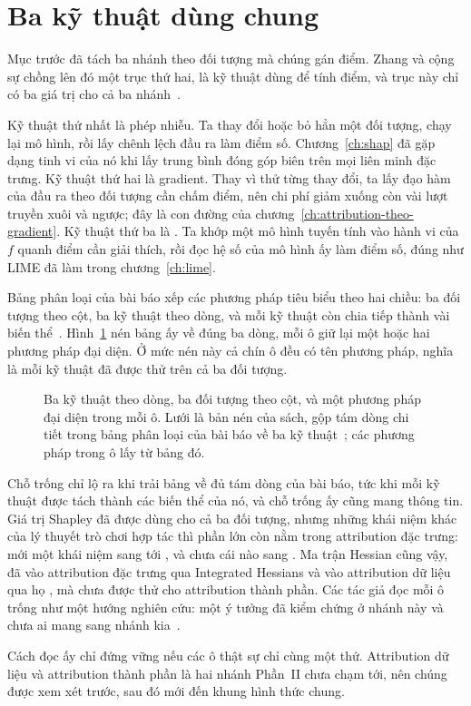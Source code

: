 \section{Ba kỹ thuật dùng chung}
\label{sec:ch07-ba-ky-thuat}

%
%
Mục trước đã tách ba nhánh theo đối tượng mà chúng gán điểm. Zhang và cộng sự
chồng lên đó một trục thứ hai, là kỹ thuật dùng để tính điểm, và trục này chỉ có
ba giá trị cho cả ba nhánh~\autocite{p18unified}.

Kỹ thuật thứ nhất là phép nhiễu. Ta thay đổi hoặc bỏ hẳn một đối tượng, chạy lại
mô hình, rồi lấy chênh lệch đầu ra làm điểm số. Chương~\ref{ch:shap} đã gặp dạng
tinh vi của nó khi  lấy trung bình đóng góp
biên trên mọi liên minh đặc trưng. Kỹ thuật thứ hai là gradient. Thay vì thử
từng thay đổi, ta lấy đạo hàm của đầu ra theo đối tượng cần chấm điểm, nên chi
phí giảm xuống còn vài lượt truyền xuôi và ngược; đây là con đường của
chương~\ref{ch:attribution-theo-gradient}. Kỹ thuật thứ ba là . Ta khớp một mô hình tuyến tính vào hành vi của $f$
quanh điểm cần giải thích, rồi đọc hệ số của mô hình ấy làm điểm số, đúng như
LIME đã làm trong chương~\ref{ch:lime}.

Bảng phân loại của bài báo xếp các phương pháp tiêu biểu theo hai chiều: ba đối
tượng theo cột, ba kỹ thuật theo dòng, và mỗi kỹ thuật còn chia tiếp thành vài
biến thể~\autocite{p18unified}. Hình~\ref{fig:ch07-ba-doi-tuong} nén bảng ấy về
đúng ba dòng, mỗi ô giữ lại một hoặc hai phương pháp đại diện. Ở mức nén này cả
chín ô đều có tên phương pháp, nghĩa là mỗi kỹ thuật đã được thử trên cả ba
đối tượng.

\begin{figure}[htbp]
  \centering
  
  \caption{Ba kỹ thuật theo dòng, ba đối tượng theo cột, và một phương pháp đại
  diện trong mỗi ô. Lưới là bản nén của sách, gộp tám dòng chi tiết trong bảng
  phân loại của bài báo về ba kỹ thuật~\autocite{p18unified}; các phương pháp
  trong ô lấy từ bảng đó.}
  \label{fig:ch07-ba-doi-tuong}
\end{figure}

Chỗ trống chỉ lộ ra khi trải bảng về đủ tám dòng của bài báo, tức khi mỗi kỹ
thuật được tách thành các biến thể của nó, và chỗ trống ấy cũng mang thông tin. Giá
trị Shapley đã được dùng cho cả ba đối tượng, nhưng những khái niệm khác của lý
thuyết trò chơi hợp tác thì phần lớn còn nằm trong attribution đặc trưng: mới
một khái niệm sang tới , và chưa cái
nào sang . Ma trận Hessian
cũng vậy, đã vào attribution đặc trưng qua Integrated Hessians và vào
attribution dữ liệu qua họ , mà chưa được
thử cho attribution thành phần. Các tác giả đọc mỗi ô trống như một hướng nghiên
cứu: một ý tưởng đã kiểm chứng ở nhánh này và chưa ai mang sang nhánh
kia~\autocite{p18unified}.

Cách đọc ấy chỉ đứng vững nếu các ô thật sự chỉ cùng một thứ. Attribution
dữ liệu và attribution thành phần là hai nhánh Phần~II chưa chạm tới, nên chúng
được xem xét trước, sau đó mới đến khung hình thức chung.
